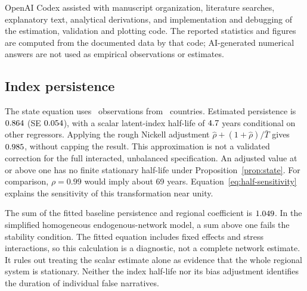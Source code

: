 OpenAI Codex assisted with manuscript organization, literature searches,
explanatory text, analytical derivations, and implementation and debugging of the estimation,
validation and plotting code. The reported statistics and figures are computed
from the documented data by that code; AI-generated numerical answers are
not used as empirical observations or estimates.

\subsection{Index persistence}\label{subsec:persistence}

The state equation uses \StateN\ observations from
\StateCountries\ countries. Estimated persistence is $0.864$ (SE $0.054$),
with a scalar latent-index half-life of $4.7$ years conditional on
other regressors. Applying the rough Nickell adjustment
$\hat\rho+(1+\hat\rho)/\bar T$ gives $0.985$, without capping the result.
This approximation is not a validated correction for the full interacted,
unbalanced specification. An adjusted value at or above one has no finite
stationary half-life under Proposition~\ref{prop:state}. For comparison,
$\rho=0.99$ would imply about 69 years. Equation~\eqref{eq:half-sensitivity}
explains the sensitivity of this transformation near unity.

The sum of the fitted baseline persistence and regional coefficient is
$1.049$. In the simplified homogeneous endogenous-network model,
a sum above one fails the stability condition. The fitted equation includes
fixed effects and stress interactions, so this calculation is a diagnostic,
not a complete network estimate. It rules out treating the scalar estimate
alone as evidence that the whole regional system is stationary. Neither the
index half-life nor its bias adjustment identifies the duration of individual
false narratives.

